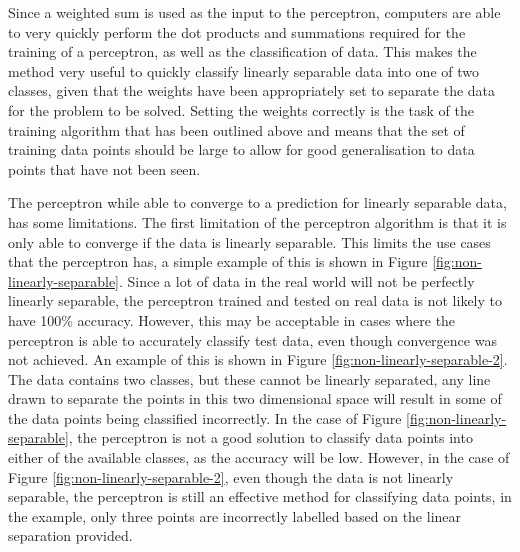 \documentclass[10pt,twocolumn,a4paper]{article}
\begin{document}
Since a weighted sum is used as the input to the perceptron, computers are able to very quickly perform the dot products and summations required for the training of a perceptron, as well as the classification of data. This makes the method very useful to quickly classify linearly separable data into one of two classes, given that the weights have been appropriately set to separate the data for the problem to be solved. Setting the weights correctly is the task of the training algorithm that has been outlined above and means that the set of training data points should be large to allow for good generalisation to data points that have not been seen.

The perceptron while able to converge to a prediction for linearly separable data, has some limitations. The first limitation of the perceptron algorithm is that it is only able to converge if the data is linearly separable. \cite{perceptron-lecture} This limits the use cases that the perceptron has, a simple example of this is shown in Figure \ref{fig:non-linearly-separable}. Since a lot of data in the real world will not be perfectly linearly separable, the perceptron trained and tested on real data is not likely to have 100\% accuracy. However, this may be acceptable in cases where the perceptron is able to accurately classify test data, even though convergence was not achieved. An example of this is shown in Figure \ref{fig:non-linearly-separable-2}. The data contains two classes, but these cannot be linearly separated, any line drawn to separate the points in this two dimensional space will result in some of the data points being classified incorrectly. In the case of Figure \ref{fig:non-linearly-separable}, the perceptron is not a good solution to classify data points into either of the available classes, as the accuracy will be low. However, in the case of Figure \ref{fig:non-linearly-separable-2}, even though the data is not linearly separable, the perceptron is still an effective method for classifying data points, in the example, only three points are incorrectly labelled based on the linear separation provided.
\end{document}
